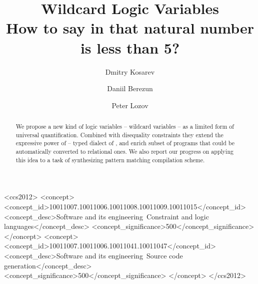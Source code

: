 \documentclass
  [screen
  , sigplan
  ]{acmart}
\begin{document}
\title{Wildcard Logic Variables\\
  \large How to say in \miniKanren{} that natural number is less than 5? }





\author{Dmitry Kosarev}

\author{Daniil Berezun}


\author{Peter Lozov}

\begin{abstract}
We propose a new kind of logic variables -- wildcard variables -- as a limited form of universal quantification.
Combined with disequality constraints they extend the expressive power of \OCanren{} -- typed dialect of \miniKanren{}, and enrich subset of \OCaml{} programs that could be automatically converted to relational ones. We also report our progress on applying this idea to a task of synthesizing pattern matching compilation scheme.
\end{abstract}


\begin{CCSXML}
<ccs2012>
<concept>
<concept_id>10011007.10011006.10011008.10011009.10011015</concept_id>
<concept_desc>Software and its engineering~Constraint and logic languages</concept_desc>
<concept_significance>500</concept_significance>
</concept>
<concept>
<concept_id>10011007.10011006.10011041.10011047</concept_id>
<concept_desc>Software and its engineering~Source code generation</concept_desc>
<concept_significance>500</concept_significance>
</concept>
</ccs2012>
\end{CCSXML}
\end{document}
